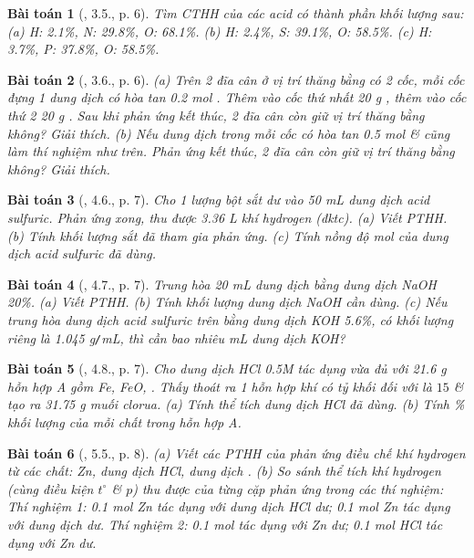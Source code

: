 \documentclass{article}
\newtheorem{baitoan}{Bài toán}
\begin{document}
\begin{baitoan}[\cite{SBT_Hoa_Hoc_9}, 3.5., p. 6]
	Tìm CTHH của các acid có thành phần khối lượng sau: (a) \emph{H: 2.1\%, N: 29.8\%, O: 68.1\%}. (b) \emph{H: 2.4\%, S: 39.1\%, O: 58.5\%}. (c) \emph{H: 3.7\%, P: 37.8\%, O: 58.5\%}.
\end{baitoan}

\begin{baitoan}[\cite{SBT_Hoa_Hoc_9}, 3.6., p. 6]
	(a) Trên 2 đĩa cân ở vị trí thăng bằng có 2 cốc, mỗi cốc đựng 1 dung dịch có hòa tan \emph{0.2 mol }. Thêm vào cốc thứ nhất \emph{20 g }, thêm vào cốc thứ 2 \emph{20 g }. Sau khi phản ứng kết thúc, 2 đĩa cân còn giữ vị trí thăng bằng không? Giải thích. (b) Nếu dung dịch trong mỗi cốc có hòa tan \emph{0.5 mol } \& cũng làm thí nghiệm như trên. Phản ứng kết thúc, 2 đĩa cân còn giữ vị trí thăng bằng không? Giải thích.
\end{baitoan}

\begin{baitoan}[\cite{SBT_Hoa_Hoc_9}, 4.6., p. 7]
	Cho 1 lượng bột sắt dư vào \emph{50 mL} dung dịch acid sulfuric. Phản ứng xong, thu được \emph{3.36 L} khí hydrogen (đktc). (a) Viết PTHH. (b) Tính khối lượng sắt đã tham gia phản ứng. (c) Tính nồng độ mol của dung dịch acid sulfuric đã dùng.
\end{baitoan}

\begin{baitoan}[\cite{SBT_Hoa_Hoc_9}, 4.7., p. 7]
	Trung hòa \emph{20 mL} dung dịch \emph{} bằng dung dịch \emph{NaOH 20\%}. (a) Viết PTHH. (b) Tính khối lượng dung dịch \emph{NaOH} cần dùng. (c) Nếu trung hòa dung dịch acid sulfuric trên bằng dung dịch \emph{KOH 5.6\%}, có khối lượng riêng là \emph{1.045 g\texttt{/}mL}, thì cần bao nhiêu \emph{mL} dung dịch \emph{KOH}?
\end{baitoan}

\begin{baitoan}[\cite{SBT_Hoa_Hoc_9}, 4.8., p. 7]
	Cho dung dịch \emph{HCl 0.5M} tác dụng vừa đủ với \emph{21.6 g} hỗn hợp A gồm \emph{Fe, FeO, }. Thấy thoát ra 1 hỗn hợp khí có tỷ khối đối với \emph{} là $15$ \& tạo ra \emph{31.75 g} muối clorua. (a) Tính thể tích dung dịch \emph{HCl} đã dùng. (b) Tính \% khối lượng của mỗi chất trong hỗn hợp A.
\end{baitoan}

\begin{baitoan}[\cite{SBT_Hoa_Hoc_9}, 5.5., p. 8]
	(a) Viết các PTHH của phản ứng điều chế khí hydrogen từ các chất: \emph{Zn}, dung dịch \emph{HCl}, dung dịch \emph{}. (b) So sánh thể tích khí hydrogen (cùng điều kiện $t^\circ$ \& $p$) thu được của từng cặp phản ứng trong các thí nghiệm: Thí nghiệm 1: \emph{0.1 mol Zn} tác dụng với dung dịch \emph{HCl} dư; \emph{0.1 mol Zn} tác dụng với dung dịch \emph{} dư.	Thí nghiệm 2: \emph{0.1 mol } tác dụng với \emph{Zn} dư; \emph{0.1 mol HCl} tác dụng với \emph{Zn} dư.
\end{baitoan}
\end{document}

